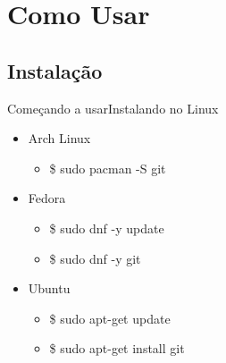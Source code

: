 \documentclass[10pt]{beamer}
\begin{document}
\section{Como Usar}
\subsection{Instalação}
\begin{frame}{Começando a usar}{Instalando no Linux}
  \begin{itemize}
  	\item Arch Linux
  	\begin{itemize}
  		\item \$ sudo pacman -S git
  	\end{itemize}
  	\item Fedora
  	\begin{itemize}
  		\item \$ sudo dnf -y update
  		\item \$ sudo dnf -y git
  	\end{itemize}
  	\item Ubuntu
  	\begin{itemize}
  		\item \$ sudo apt-get update
  		\item \$ sudo apt-get install git
  	\end{itemize}
  \end{itemize}
\end{frame}
\end{document}

